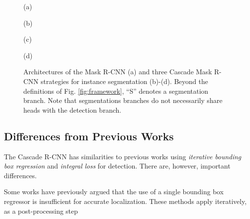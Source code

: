 \documentclass[10pt,journal,compsoc]{IEEEtran}
\begin{document}
\begin{figure*}[!t]
\begin{minipage}[b]{.15\linewidth}
\centering
\centerline{}{(a)}
\end{minipage}
\hfill
\begin{minipage}[b]{.25\linewidth}
\centering
\centerline{}{(b)}
\end{minipage}
\hfill
\begin{minipage}[b]{.26\linewidth}
\centering
\centerline{}{(c)}
\end{minipage}
\hfill
\begin{minipage}[b]{.29\linewidth}
\centering
\centerline{}{(d)}
\end{minipage}
\caption{Architectures of the Mask R-CNN (a) and three Cascade Mask R-CNN strategies
for instance segmentation (b)-(d). Beyond the definitions of
Fig. \ref{fig:framework}, ``S'' denotes a segmentation branch.
Note that segmentations branches do not necessarily share heads with the
detection branch.}
\label{fig:maskframework}
\end{figure*}

\subsection{Differences from Previous Works}

The Cascade R-CNN has similarities to previous works using \textit{iterative bounding box regression} and \textit{integral loss} for detection. There are, however, important differences.

\vspace{0.2cm}
Some works \cite{DBLP:conf/iccv/GidarisK15,DBLP:conf/bmvc/GidarisK16,DBLP:conf/cvpr/HeZRS16} have previously argued that the use of a single
bounding box regressor  is insufficient for accurate localization.
These methods apply  iteratively, as a post-processing step
\end{document}
